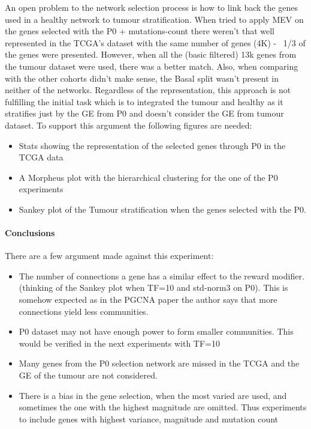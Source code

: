 An open problem to the network selection process is how to link back the genes used in a healthy network to tumour stratification. When tried to apply MEV on the genes selected with the P0 + mutations-count there weren't that well represented in the TCGA's dataset with the same number of genes (4K) - ~1/3 of the genes were presented. However, when all the (basic filtered) 13k genes from the tumour dataset were used, there was a better match. Also, when comparing with the other cohorts didn't make sense, the Basal split wasn't present in neither of the networks. Regardless of the representation, this approach is not fulfilling the initial task which is to integrated the tumour and healthy as it stratifies just by the GE from P0 and doesn't consider the GE from tumour dataset.
To support this argument the following figures are needed:
\begin{itemize}
    \item Stats showing the representation of the selected genes through P0 in the TCGA data
    \item A Morpheus plot with the hierarchical clustering for the one of the P0 experiments
    \item Sankey plot of the Tumour stratification when the genes selected with the P0.
\end{itemize}


\paragraph{Conclusions}

There are a few argument made against this experiment:
\begin{itemize}
    \item The number of connections a gene has a similar effect to the reward modifier. (thinking of the Sankey plot when TF=10 and std-norm3 on P0). This is somehow expected as in the PGCNA paper the author says that more connections yield less communities.
    \item P0 dataset may not have enough power to form smaller communities. This would be verified in the next experiments with TF=10
    \item Many genes from the P0 selection network are missed in the TCGA and the GE of the tumour are not considered.
    \item There is a bias in the gene selection, when the most varied are used, and sometimes the one with the highest magnitude are omitted. Thus experiments to include genes with highest variance, magnitude and mutation count
\end{itemize}


